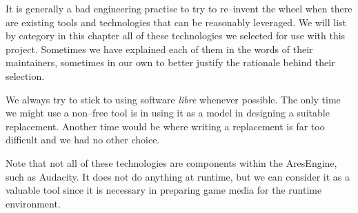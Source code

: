 

It is generally a bad engineering practise to try to re--invent the wheel when there are existing tools and technologies that can be reasonably leveraged. We will list by category in this chapter all of these technologies we selected for use with this project. Sometimes we have explained each of them in the words of their maintainers, sometimes in our own to better justify the rationale behind their selection.

We always try to stick to using software {\it libre} whenever possible. The only time we might use a non--free tool is in using it as a model in designing a suitable replacement. Another time would be where writing a replacement is far too difficult and we had no other choice.

Note that not all of these technologies are components within the AresEngine, such as Audacity. It does not do anything at runtime, but we can consider it as a valuable  tool since it is necessary in preparing game media for the runtime environment.













\StopChapter

